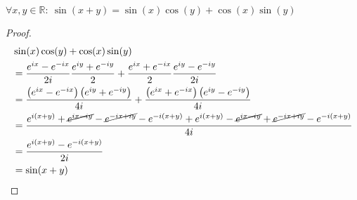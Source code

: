 \documentclass[main.tex]{subfiles}
\begin{document}
\begin{bpr}
  $\forall x,y\in \mathbb{R}:\ \sin(x+y) = \sin(x)\cos(y) + \cos(x)\sin(y)$

  \begin{proof}
    \begin{align*}
      &\sin(x)\cos(y) + \cos(x)\sin(y)\\
      &=\frac{e^{ix} - e^{-ix}}{2i}\frac{e^{iy} + e^{-iy}}{2} + \frac{e^{ix} + e^{-ix}}{2}\frac{e^{iy} - e^{-iy}}{2i}\\
      &= \frac{\left(e^{ix} - e^{-ix}\right)\left(e^{iy} + e^{-iy}\right)}{4i} + \frac{\left(e^{ix} + e^{-ix}\right)\left(e^{iy} - e^{-iy}\right)}{4i}\\
      &= \frac{e^{i(x+y)}+\cancel{e^{ix-iy}}-\cancel{e^{-ix+iy}}-e^{-i(x+y)} + e^{i(x+y)}-\cancel{e^{ix-iy}}+\cancel{e^{-ix+iy}}-e^{-i(x+y)}}{4i}\\
      &= \frac{e^{i(x+y)} - e^{-i(x+y)}}{2i}\\
      &= \sin(x+y)
    \end{align*}
  \end{proof}
\end{bpr}
\end{document}
